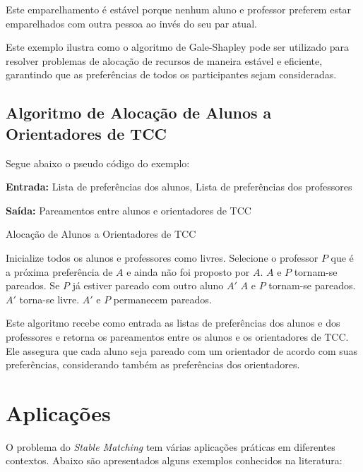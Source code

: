 \documentclass[12pt]{article}
\begin{document}
Este emparelhamento é estável porque nenhum aluno e professor preferem estar emparelhados com outra pessoa ao invés do seu par atual.

Este exemplo ilustra como o algoritmo de Gale-Shapley pode ser utilizado para resolver problemas de alocação de recursos de maneira estável e eficiente, garantindo que as preferências de todos os participantes sejam consideradas.


\newpage
\subsection{Algoritmo de Alocação de Alunos a Orientadores de TCC}
Segue abaixo o pseudo código do exemplo: 

\textbf{Entrada:} Lista de preferências dos alunos, Lista de preferências dos professores


\textbf{Saída:} Pareamentos entre alunos e orientadores de TCC

\begin{algorithm}
\caption{Alocação de Alunos a Orientadores de TCC}
\begin{algorithmic}[1]
\State Inicialize todos os alunos e professores como livres.
\State Selecione o professor $P$ que é a próxima preferência de $A$ e ainda não foi proposto por $A$.
\State $A$ e $P$ tornam-se pareados.
\Else
\State Se $P$ já estiver pareado com outro aluno $A'$
\State $A$ e $P$ tornam-se pareados.
\State $A'$ torna-se livre.
\Else
\State $A'$ e $P$ permanecem pareados.
\EndIf
\EndIf
\EndWhile
\end{algorithmic}
\end{algorithm}

Este algoritmo recebe como entrada as listas de preferências dos alunos e dos professores e retorna os pareamentos entre os alunos e os orientadores de TCC. Ele assegura que cada aluno seja pareado com um orientador de acordo com suas preferências, considerando também as preferências dos orientadores.

\section{Aplicações}

O problema do \textit{Stable Matching} tem várias aplicações práticas em diferentes contextos. Abaixo são apresentados alguns exemplos conhecidos na literatura:
\end{document}
